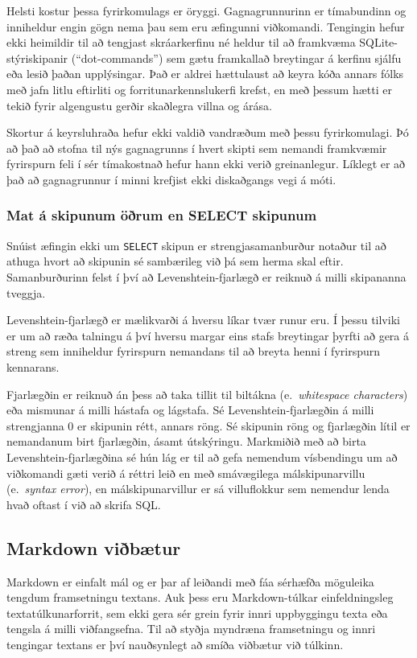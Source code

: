 \documentclass[a4paper,12pt,twoside,BCOR=10mm]{scrbook}
\begin{document}
Helsti kostur þessa fyrirkomulags er öryggi. Gagnagrunnurinn er tímabundinn og inniheldur engin gögn nema þau sem eru æfingunni viðkomandi. Tengingin hefur ekki heimildir til að tengjast skráarkerfinu né heldur til að framkvæma SQLite-stýriskipanir (``dot-commands'') sem gætu framkallað breytingar á kerfinu sjálfu eða lesið þaðan upplýsingar. Það er aldrei hættulaust að keyra kóða annars fólks með jafn litlu eftirliti og forritunarkennslukerfi krefst, en með þessum hætti er tekið fyrir algengustu gerðir skaðlegra villna og árása.

Skortur á keyrsluhraða hefur ekki valdið vandræðum með þessu fyrirkomulagi. Þó að það að stofna til nýs gagnagrunns í hvert skipti sem nemandi framkvæmir fyrirspurn feli í sér tímakostnað hefur hann ekki verið greinanlegur. Líklegt er að það að gagnagrunnur í minni krefjist ekki diskaðgangs vegi á móti.
\subsubsection{Mat á skipunum öðrum en SELECT skipunum}
\label{sec:other-command-analysis}
Snúist æfingin ekki um \texttt{SELECT} skipun er strengjasamanburður notaður til að athuga hvort að skipunin sé sambærileg við þá sem herma skal eftir. Samanburðurinn felst í því að Levenshtein-fjarlægð er reiknuð á milli skipananna tveggja. 

Levenshtein-fjarlægð er mælikvarði á hversu líkar tvær runur eru. Í þessu tilviki er um að ræða talningu á því hversu margar eins stafs breytingar þyrfti að gera á streng sem inniheldur fyrirspurn nemandans til að breyta henni í fyrirspurn kennarans.

Fjarlægðin er reiknuð án þess að taka tillit til biltákna (e.\ \emph{whitespace characters}) eða mismunar á milli hástafa og lágstafa. Sé Levenshtein-fjarlægðin á milli strengjanna 0 er skipunin rétt, annars röng. Sé skipunin röng og fjarlægðin lítil er nemandanum birt fjarlægðin, ásamt útskýringu. Markmiðið með að birta Levenshtein-fjarlægðina sé hún lág er til að gefa nemendum vísbendingu um að viðkomandi gæti verið á réttri leið en með smávægilega málskipunarvillu (e.\ \emph{syntax error}), en málskipunarvillur er sá villuflokkur sem nemendur lenda hvað oftast í við að skrifa SQL\cite{ahadi2016students}.

\subsection{Markdown viðbætur}
\label{sec:markdown-additions}
Markdown er einfalt mál og er þar af leiðandi með fáa sérhæfða möguleika tengdum framsetningu textans. Auk þess eru Markdown-túlkar einfeldningsleg textatúlkunarforrit, sem ekki gera sér grein fyrir innri uppbyggingu texta eða tengsla á milli viðfangsefna. Til að styðja myndræna framsetningu og innri tengingar textans er því nauðsynlegt að smíða viðbætur við túlkinn.
 
\end{document}
